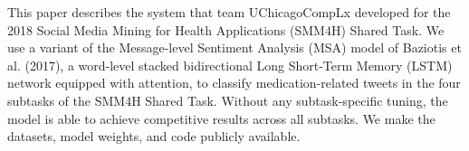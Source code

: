 This paper describes the system that team UChicagoCompLx developed for the 2018 Social Media Mining for Health Applications (SMM4H) Shared Task. We use a variant of the Message-level Sentiment Analysis (MSA) model of Baziotis et al. (2017), a word-level stacked bidirectional Long Short-Term Memory (LSTM) network equipped with attention, to classify medication-related tweets in the four subtasks of the SMM4H Shared Task. Without any subtask-specific tuning, the model is able to achieve competitive results across all subtasks. We make the datasets, model weights, and code publicly available.

